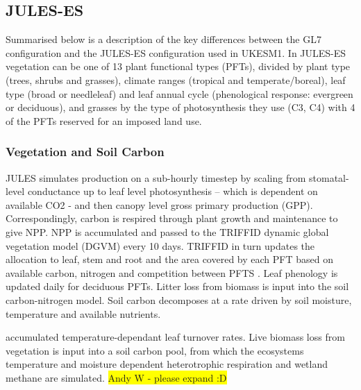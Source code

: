\documentclass[bg, manuscript]{copernicus}
\newcommand{\hilight}[1]{\colorbox{yellow}{#1}}
\begin{document}
\subsection{JULES-ES}

Summarised below is a description of the key differences between the GL7 configuration and the JULES-ES configuration used in UKESM1. In JULES-ES vegetation can be one of 13 plant functional types (PFTs), divided by plant type (trees, shrubs and grasses), climate ranges (tropical and temperate/boreal), leaf type (broad or needleleaf) and leaf annual cycle (phenological response: evergreen or deciduous), and grasses by the type of photosynthesis they use (C3, C4) with 4 of the PFTs reserved for an imposed land use.  \\

\subsubsection{Vegetation and Soil Carbon}
JULES simulates production on a sub-hourly timestep by scaling from stomatal-level conductance up to leaf level photosynthesis – which is dependent on available CO2 - and then canopy level gross primary production (GPP). Correspondingly, carbon is respired through plant growth and maintenance to give NPP. NPP is accumulated and passed to the TRIFFID dynamic global vegetation model (DGVM) every 10 days. TRIFFID in turn updates the allocation to leaf, stem and root and the area covered by each PFT based on available carbon, nitrogen and competition between PFTS \citep{wiltshire2020jules}. Leaf phenology is updated daily for deciduous PFTs. Litter loss from biomass is input into the soil carbon-nitrogen model. Soil carbon decomposes at a rate driven by soil moisture, temperature and available nutrients. 



accumulated temperature-dependant leaf turnover rates. Live biomass loss from vegetation is input into a soil carbon pool, from which the ecosystems temperature and moisture dependent heterotrophic respiration and wetland methane are simulated. 
\hilight{Andy W - please expand :D}
\end{document}
